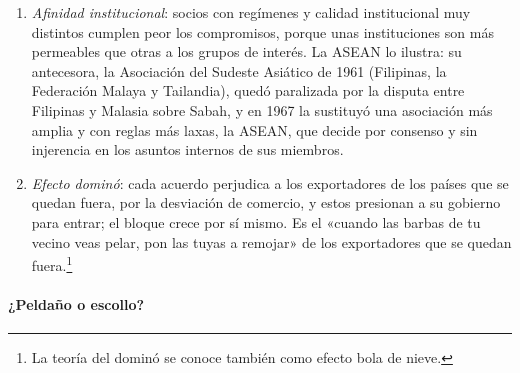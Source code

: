 \documentclass[11pt]{article}
\begin{document}
\begin{itemize}
\begin{enumerate}
    \begin{itemize}
    \item Los productores están mejor organizados que los consumidores, y eso sesga los acuerdos: un acuerdo de libre comercio es más viable políticamente cuando \emph{desvía} comercio, porque entonces los productores del socio ganan cuota a costa de terceros y apoyan el acuerdo, aunque reduzca el bienestar\nocite{GrossmanHelpman1995Politics}.
    \item Lo que  veía como un riesgo es, para la economía política, un incentivo. Por eso los sectores sensibles suelen quedar fuera de los acuerdos o con largos periodos de transición.
    \end{itemize}
  \item \emph{Afinidad institucional}: socios con regímenes y calidad institucional muy distintos cumplen peor los compromisos, porque unas instituciones son más permeables que otras a los grupos de interés. La ASEAN lo ilustra: su antecesora, la Asociación del Sudeste Asiático de 1961 (Filipinas, la Federación Malaya y Tailandia), quedó paralizada por la disputa entre Filipinas y Malasia sobre Sabah, y en 1967 la sustituyó una asociación más amplia y con reglas más laxas, la ASEAN, que decide por consenso y sin injerencia en los asuntos internos de sus miembros\nocite{ASEAN2026Founding}.
  \item \emph{Efecto dominó}: cada acuerdo perjudica a los exportadores de los países que se quedan fuera, por la desviación de comercio, y estos presionan a su gobierno para entrar; el bloque crece por sí mismo\nocite{Baldwin1993Domino}. Es el «cuando las barbas de tu vecino veas pelar, pon las tuyas a remojar» de los exportadores que se quedan fuera.\footnote{La teoría del dominó se conoce también como efecto bola de nieve.}
  \end{enumerate}
\end{itemize}

\paragraph{¿Peldaño o escollo?}
\end{document}
